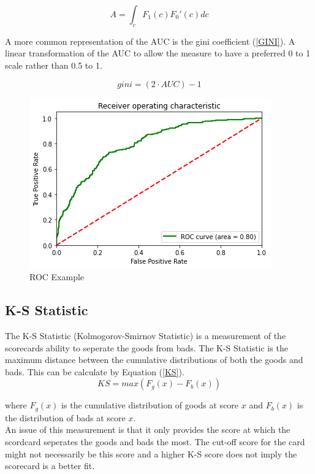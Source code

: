 \begin{equation}\label{AUC}
A = \int_{c}^{} F_1(c){F_0}'(c) dc
\end{equation}

A more common representation of the AUC is the gini coefficient (\ref{GINI}). A linear transformation of the AUC to allow the measure to have a preferred 0 to 1 scale rather than 0.5 to 1.

\begin{equation}\label{GINI}
gini = (2 \cdot AUC) - 1
\end{equation}

\begin{figure}[!ht]
	\centering
	\includegraphics[scale=1.00]{figs/roc_example.png}
	\caption{ROC Example \label{roc_example}}
\end{figure}

\subsection*{K-S Statistic}

The K-S Statistic (Kolmogorov-Smirnov Statistic) is a measurement of the scorecards ability to seperate the goods from bads. The K-S Statistic is the maximum distance between the cumulative distributions of both the goods and bads. This can be calculate by Equation (\ref{KS}). \\

\begin{equation}\label{KS}
KS = max(F_{g}(x) - F_{b}(x))
\end{equation}

where $F_{g}(x)$ is the cumulative distribution of goods at score $x$ and $F_{b}(x)$ is the distribution of bads at score $x$. \\

An issue of this measurement is that it only provides the score at which the scordcard seperates the goods and bads the most. The cut-off score for the card might not necessarily be this score and a higher K-S score does not imply the scorecard is a better fit. 

